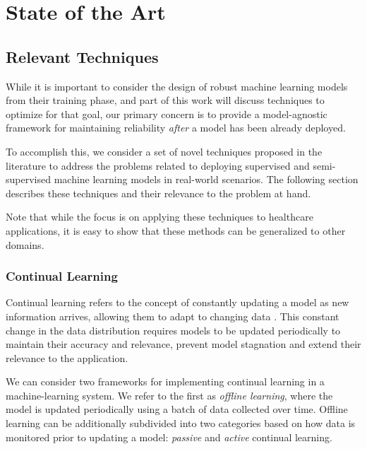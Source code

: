 \documentclass[../main.tex]{subfiles}
\begin{document}
    \chapter{State of the Art} \label{chap:state_of_the_art}

    \section{Relevant Techniques} \label{sec:relevant_techniques}

    While it is important to consider the design of robust machine learning models from their training phase, and part of this work will discuss techniques to optimize for that goal, our primary concern is to provide a model-agnostic framework for maintaining reliability \textit{after} a model has been already deployed.
    
    To accomplish this, we consider a set of novel techniques proposed in the literature to address the problems related to deploying supervised and semi-supervised machine learning models in real-world scenarios. The following section describes these techniques and their relevance to the problem at hand. 
    
    Note that while the focus is on applying these techniques to healthcare applications, it is easy to show that these methods can be generalized to other domains.

    
    
	
	\subsection{Continual Learning} \label{sec:continual_learning}
	
	 Continual learning refers to the concept of constantly updating a model as new information arrives, allowing them to adapt to changing data \cite{huyen_designing_2022}. This constant change in the data distribution requires models to be updated periodically to maintain their accuracy and relevance, prevent model stagnation and extend their relevance to the application.

     We can consider two frameworks for implementing continual learning in a machine-learning system. We refer to the first as \textit{offline learning}, where the model is updated periodically using a batch of data collected over time. Offline learning can be additionally subdivided into two categories based on how data is monitored prior to updating a model: \textit{passive} and \textit{active} continual learning.
\end{document}
